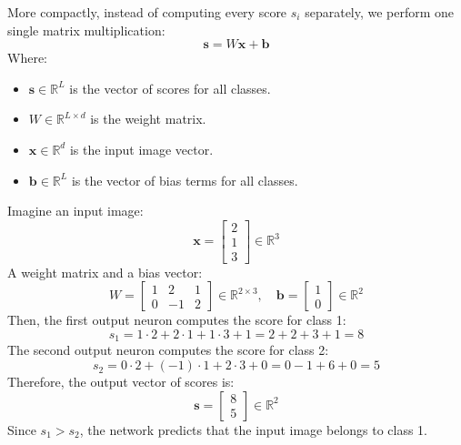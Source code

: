 \highspace
More compactly, instead of computing every score $s_i$ separately, we perform one single matrix multiplication:
\begin{equation}\label{eq:score-for-all-classes}
    \mathbf{s} = W \mathbf{x} + \mathbf{b}
\end{equation}
Where:
\begin{itemize}
    \item $\mathbf{s} \in \mathbb{R}^{L}$ is the vector of scores for all classes.
    \item $W \in \mathbb{R}^{L \times d}$ is the weight matrix.
    \item $\mathbf{x} \in \mathbb{R}^{d}$ is the input image vector.
    \item $\mathbf{b} \in \mathbb{R}^{L}$ is the vector of bias terms for all classes.
\end{itemize}

\begin{examplebox}
    Imagine an input image:
    \begin{equation*}
        \mathbf{x} = \begin{bmatrix}
            2 \\ 1 \\ 3
        \end{bmatrix} \in \mathbb{R}^{3}
    \end{equation*}
    A weight matrix and a bias vector:
    \begin{equation*}
        W = \begin{bmatrix}
            1 & 2 & 1 \\
            0 & -1 & 2
        \end{bmatrix} \in \mathbb{R}^{2 \times 3}, \quad \mathbf{b} = \begin{bmatrix}
            1 \\ 0
        \end{bmatrix} \in \mathbb{R}^{2}
    \end{equation*}
    Then, the first output neuron computes the score for class 1:
    \begin{equation*}
        s_1 = 1 \cdot 2 + 2 \cdot 1 + 1 \cdot 3 + 1 = 2 + 2 + 3 + 1 = 8
    \end{equation*}
    The second output neuron computes the score for class 2:
    \begin{equation*}
        s_2 = 0 \cdot 2 + (-1) \cdot 1 + 2 \cdot 3 + 0 = 0 - 1 + 6 + 0 = 5
    \end{equation*}
    Therefore, the output vector of scores is:
    \begin{equation*}
        \mathbf{s} = \begin{bmatrix}
            8 \\ 5
        \end{bmatrix} \in \mathbb{R}^{2}
    \end{equation*}
    Since $s_1 > s_2$, the network predicts that the input image belongs to class 1.
\end{examplebox}

